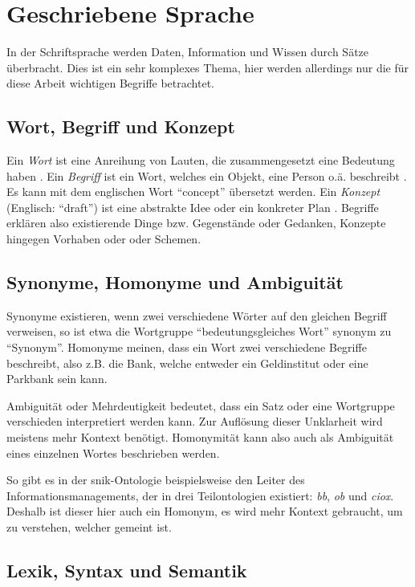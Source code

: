 \section{Geschriebene Sprache}

In der Schriftsprache werden Daten, Information und Wissen durch Sätze überbracht.
Dies ist ein sehr komplexes Thema, hier werden allerdings nur die für diese Arbeit wichtigen Begriffe betrachtet.

\subsection{Wort, Begriff und Konzept}

Ein \emph{Wort} ist eine Anreihung von Lauten, die zusammengesetzt eine Bedeutung haben \citep[S.~1185]{duden}.
Ein \emph{Begriff} ist ein Wort, welches ein Objekt, eine Person o.ä. beschreibt \citep[S.~235]{duden}.
Es kann mit dem englischen Wort \enquote{concept} übersetzt werden.
Ein \emph{Konzept} (Englisch: \enquote{draft}) ist eine abstrakte Idee oder ein konkreter Plan \citep[S.~628]{duden}.
Begriffe erklären also existierende Dinge bzw. Gegenstände oder Gedanken, Konzepte hingegen Vorhaben oder oder Schemen.

\subsection{Synonyme, Homonyme und Ambiguität}

Synonyme existieren, wenn zwei verschiedene Wörter auf den gleichen Begriff verweisen, so ist etwa die Wortgruppe \enquote{bedeutungsgleiches Wort} synonym zu \enquote{Synonym}.
Homonyme meinen, dass ein Wort zwei verschiedene Begriffe beschreibt, also z.B. die Bank, welche entweder ein Geldinstitut oder eine Parkbank sein kann.

Ambiguität oder Mehrdeutigkeit bedeutet, dass ein Satz oder eine Wortgruppe verschieden interpretiert werden kann.
Zur Auflösung dieser Unklarheit wird meistens mehr Kontext benötigt.
Homonymität kann also auch als Ambiguität eines einzelnen Wortes beschrieben werden.

So gibt es in der \ac{snik}-Ontologie beispielsweise den Leiter des Informationsmanagements, der in drei Teilontologien existiert: \emph{bb}, \emph{ob} und \emph{ciox}.
Deshalb ist dieser hier auch ein Homonym, es wird mehr Kontext gebraucht, um zu verstehen, welcher gemeint ist.

\subsection{Lexik, Syntax und Semantik}

